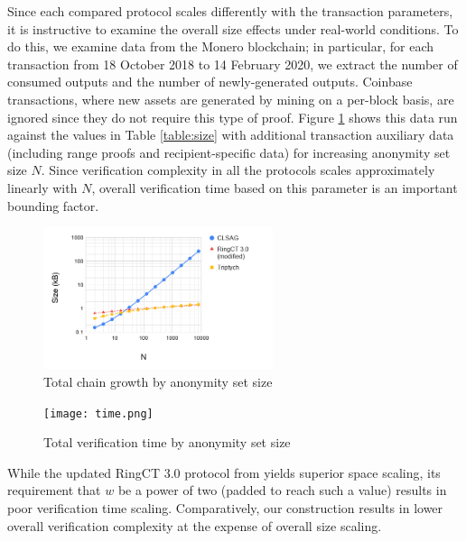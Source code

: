 \documentclass{article}
\theoremstyle{definition}
\begin{document}
Since each compared protocol scales differently with the transaction parameters, it is instructive to examine the overall size effects under real-world conditions.
To do this, we examine data from the Monero blockchain; in particular, for each transaction from 18 October 2018 to 14 February 2020, we extract the number of consumed outputs and the number of newly-generated outputs.
Coinbase transactions, where new assets are generated by mining on a per-block basis, are ignored since they do not require this type of proof.
Figure \ref{fig:size} shows this data run against the values in Table \ref{table:size} with additional transaction auxiliary data (including range proofs and recipient-specific data) for increasing anonymity set size $N$.
Since verification complexity in all the protocols scales approximately linearly with $N$, overall verification time based on this parameter is an important bounding factor.

\begin{figure}
\centering
\includegraphics[width=0.6\textwidth]{size.png}
\caption{Total chain growth by anonymity set size}
\label{fig:size}
\end{figure}

\begin{figure}
\centering
\texttt{[image: time.png]}
\caption{Total verification time by anonymity set size}
\label{fig:time}
\end{figure}

While the updated RingCT 3.0 protocol from \cite{rct3} yields superior space scaling, its requirement that $w$ be a power of two (padded to reach such a value) results in poor verification time scaling.
Comparatively, our construction results in lower overall verification complexity at the expense of overall size scaling.




\end{document}
